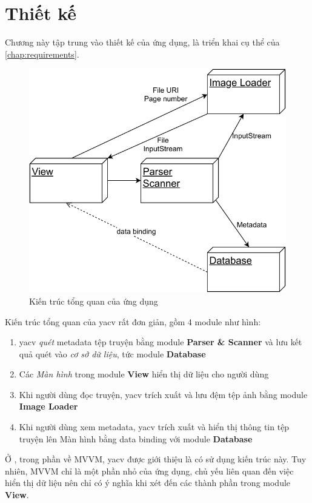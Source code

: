 \documentclass[../../thesis]{subfiles}
\begin{document}
\chapter{Thiết kế}\label{chap:design}

Chương này tập trung vào thiết kế của ứng dụng, là triển khai cụ thể của
\autoref{chap:requirements}.

\begin{figure}[H]
    \centering
    \includegraphics[width=0.6\linewidth]{../images/overall_architecture.pdf}
    \caption{Kiến trúc tổng quan của ứng dụng}
    \label{fig:overall-architecture}
\end{figure}

Kiến trúc tổng quan của yacv rất đơn giản, gồm 4 module như hình:

\begin{enumerate}
    \item
        yacv \emph{quét} metadata tệp truyện bằng module \textbf{Parser \&
        Scanner} và lưu kết quả quét vào \emph{cơ sở dữ liệu}, tức module
        \textbf{Database}
    \item
        Các \emph{Màn hình} trong module \textbf{View} hiển thị dữ liệu cho
        người dùng
    \item
        Khi người dùng đọc truyện, yacv trích xuất và lưu đệm tệp ảnh bằng
        module \textbf{Image Loader}
    \item
        Khi người dùng xem metadata, yacv trích xuất và hiển thị thông tin tệp
        truyện lên Màn hình bằng data binding với module \textbf{Database}
\end{enumerate}

Ở , trong phần về MVVM, yacv được giới thiệu là có sử
dụng kiến trúc này. Tuy nhiên, MVVM chỉ là một phần nhỏ của ứng dụng, chủ yếu
liên quan đến việc hiển thị dữ liệu nên chỉ có ý nghĩa khi xét đến các thành
phần trong module \textbf{View}.
\end{document}
